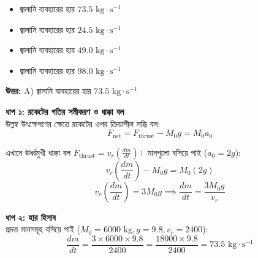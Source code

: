 \documentclass[12pt, a4paper]{article}
\begin{document}
{{\begin{center}
\end{center}
\vspace{1em}

\begin{itemize}[label={}, leftmargin=1cm, itemsep=0.5em]
    \item[\textbf{A)}] জ্বালানি ব্যবহারের হার $73.5\text{ kg}\cdot\text{s}^{-1}$
    \item[\textbf{B)}] জ্বালানি ব্যবহারের হার $24.5\text{ kg}\cdot\text{s}^{-1}$
    \item[\textbf{C)}] জ্বালানি ব্যবহারের হার $49.0\text{ kg}\cdot\text{s}^{-1}$
    \item[\textbf{D)}] জ্বালানি ব্যবহারের হার $98.0\text{ kg}\cdot\text{s}^{-1}$
\end{itemize}

\vspace{0.5em}
\begin{tcolorbox}[answerbox]
    \textbf{\color{success} উত্তর:} A) জ্বালানি ব্যবহারের হার $73.5\text{ kg}\cdot\text{s}^{-1}$
\end{tcolorbox}
\vspace{1em}

\begin{tcolorbox}[solutionbox={সমাধান (Solution)}]
    \noindent
    \textbf{ধাপ ১: রকেটের গতির সমীকরণ ও ধাক্কা বল} \\
    উল্লম্ব উৎক্ষেপণের ক্ষেত্রে রকেটের ওপর ক্রিয়াশীল লব্ধি বল:
    \[ F_{\text{net}} = F_{\text{thrust}} - M_0 g = M_0 a_0 \]
    
    এখানে ঊর্ধ্বমুখী ধাক্কা বল $F_{\text{thrust}} = v_r \left(\frac{dm}{dt}\right)$। মানগুলো বসিয়ে পাই ($a_0 = 2g$):
    \[ v_r \left(\frac{dm}{dt}\right) - M_0 g = M_0 (2g) \]
    \[ v_r \left(\frac{dm}{dt}\right) = 3 M_0 g \implies \frac{dm}{dt} = \frac{3 M_0 g}{v_r} \]
    
    \vspace{0.5em}
    \noindent\textbf{ধাপ ২: হার হিসাব} \\
    প্রদত্ত মানসমূহ বসিয়ে পাই ($M_0 = 6000\text{ kg}, g = 9.8, v_r = 2400$):
    \[ \frac{dm}{dt} = \frac{3 \times 6000 \times 9.8}{2400} = \frac{18000 \times 9.8}{2400} = \mathbf{73.5}\text{ kg}\cdot\text{s}^{-1} \]
\end{tcolorbox}

}}
\end{document}
